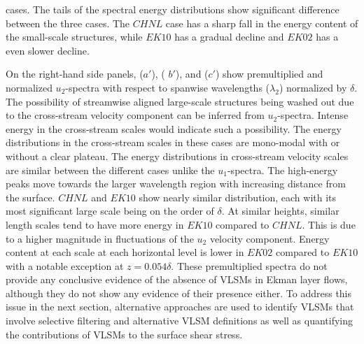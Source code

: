 cases. The tails of the spectral energy distributions show significant difference between the three cases. The $CHNL$ case has a sharp fall in the energy content of the small-scale structures, while $EK10$ has  a gradual decline and $EK02$ has a even slower decline. 

On the right-hand side panels,  ($a'$), ( $b'$), and ($c'$) show premultiplied and normalized $u_2$-spectra with respect to spanwise wavelengths ($\lambda_2$) normalized by $\delta$. The possibility  of streamwise aligned large-scale structures  being washed out due to the cross-stream velocity component can be inferred from $u_2$-spectra. Intense energy in the cross-stream scales would indicate such a possibility. The energy  distributions in the cross-stream scales in these cases are mono-modal with or without a clear plateau. The energy distributions in cross-stream velocity scales are similar between the different cases unlike the $u_1$-spectra. The high-energy peaks move towards the larger wavelength region with increasing distance from the surface. $CHNL$ and $EK10$  show nearly similar distribution, each with its most significant large scale being on the order of $\delta$. At similar heights,  similar length scales tend to have more energy in $EK10$ compared to $CHNL$. This is due to a higher magnitude in fluctuations of the $u_2$ velocity component. Energy content at each scale at each horizontal level is lower in $EK02$ compared to $EK10$ with a notable exception at $z= 0.054\delta$. These premultiplied spectra do not provide any conclusive evidence of the absence of VLSMs in Ekman layer  flows, although they do not show any evidence of their presence either.  To address this issue in the next section, alternative approaches are used to identify VLSMs that involve selective filtering and alternative VLSM definitions as well as quantifying the contributions of VLSMs to the surface shear stress.

